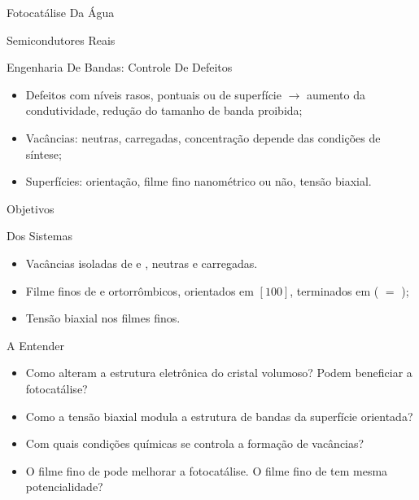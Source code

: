\begin{frame}[allowframebreaks]{Fotocatálise Da Água}
\begin{block}{Semicondutores Reais}
\begin{itemize}
\begin{itemize}
			\end{itemize}
		\end{itemize}
	\end{block}
	\begin{block}{Engenharia De Bandas: Controle De Defeitos}
		\begin{itemize}
			\item Defeitos com níveis rasos, pontuais ou de superfície $\to$ aumento da condutividade, redução do tamanho de banda proibida;
			\item Vacâncias: neutras, carregadas, concentração depende das condições de síntese;
			\item Superfícies: orientação, filme fino nanométrico ou não, tensão biaxial.
		\end{itemize}
	\end{block}
\end{frame}
\begin{frame}{Objetivos}
	\begin{block}{Dos Sistemas}
		\begin{itemize}
			\item Vacâncias isoladas de  e , neutras e carregadas.
			\item Filme finos de  e  ortorrômbicos, orientados em $[100]$, terminados em  ( $=$ );
			\item Tensão biaxial nos filmes finos.
		\end{itemize}
	\end{block}
	\begin{block}{A Entender}
		\begin{itemize}
			\item Como alteram a estrutura eletrônica do cristal volumoso? Podem beneficiar a fotocatálise?
			\item Como a tensão biaxial modula a estrutura de bandas da superfície orientada?
			\item Com quais condições químicas se controla a formação de vacâncias?
			\item O filme fino de  pode melhorar a fotocatálise. O filme fino de  tem mesma potencialidade?
		\end{itemize}
	\end{block}
\end{frame}
